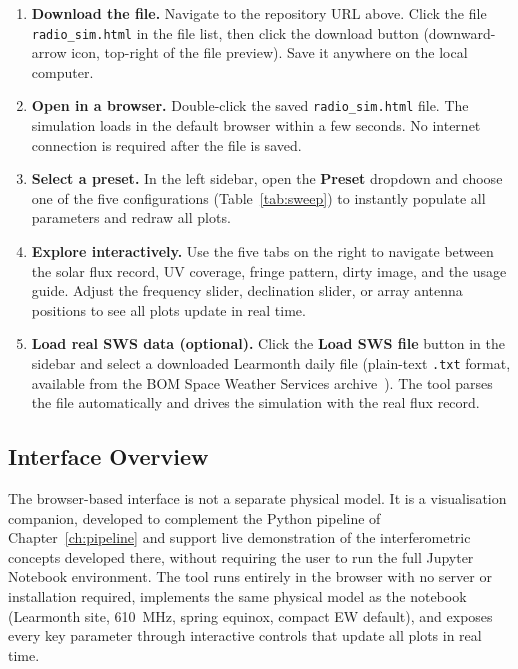 \begin{enumerate}[leftmargin=1.8em, label=\textbf{Step \arabic*.}]
  \item \textbf{Download the file.}
        Navigate to the repository URL above.  Click the file
        \texttt{radio\_sim.html} in the file list, then click the download
        button (downward-arrow icon, top-right of the file preview).  Save it
        anywhere on the local computer.

  \item \textbf{Open in a browser.}
        Double-click the saved \texttt{radio\_sim.html} file.  The simulation
        loads in the default browser within a few seconds.  No internet
        connection is required after the file is saved.

  \item \textbf{Select a preset.}
        In the left sidebar, open the \textbf{Preset} dropdown and choose one
        of the five configurations (Table~\ref{tab:sweep}) to instantly
        populate all parameters and redraw all plots.

  \item \textbf{Explore interactively.}
        Use the five tabs on the right to navigate between the solar flux
        record, UV coverage, fringe pattern, dirty image, and the usage guide.
        Adjust the frequency slider, declination slider, or array antenna
        positions to see all plots update in real time.

  \item \textbf{Load real SWS data (optional).}
        Click the \textbf{Load SWS file} button in the sidebar and select a
        downloaded Learmonth daily file (plain-text \texttt{.txt} format,
        available from the BOM Space Weather Services archive~\citep{sws}).
        The tool parses the file automatically and drives the simulation with
        the real flux record.
\end{enumerate}

\subsection{Interface Overview}
\label{subsec:appx-html-interface}

The browser-based interface is not a separate physical model. It is a
visualisation companion, developed to complement the Python pipeline of
Chapter~\ref{ch:pipeline} and support live demonstration of the
interferometric concepts developed there, without requiring the user to run
the full Jupyter Notebook environment. The tool runs entirely in the browser
with no server or installation required, implements the same physical model
as the notebook (Learmonth site, 610~MHz, spring equinox, compact EW
default), and exposes every key parameter through interactive controls that
update all plots in real time.

